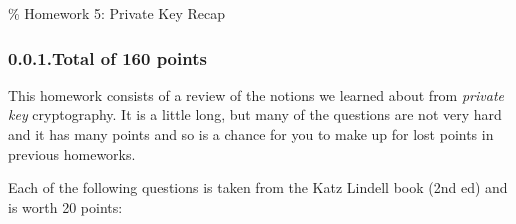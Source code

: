 \documentclass{article}
\begin{document}
\noindent{}\% Homework 5: Private Key Recap%
\newcommand{\zo}{\{0,1\}}
\newcommand{\E}{\mathbb{E}}
\newcommand{\Z}{\mathbb{Z}}
\newcommand{\getsr}{\leftarrow_R\;}
\subsubsection{0.0.1.\hspace*{0.5em}Total of 160 points}\label{sec-total-of-160-points}%

\noindent{}This homework consists of a review of the notions we learned about from \emph{private key} cryptography.
It is a little long, but many of the questions are not very hard and it has many points and
so is a chance for you to make up for lost points in previous homeworks.%

Each of the following questions is taken from the Katz Lindell book (2nd ed)  and is worth 20 points:%
\end{document}
